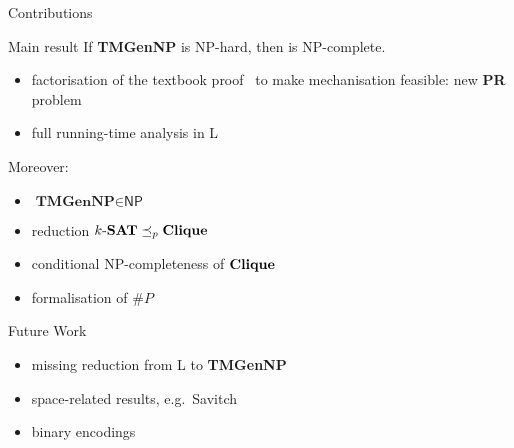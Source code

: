 \documentclass[11pt,usenames,dvipsnames,
hyperref={pdfencoding=auto,psdextra}]{beamer}
\makeatletter
\def\beamer@writeslidentry@miniframesoff{%
  \expandafter\beamer@ifempty\expandafter{\beamer@framestartpage}{}%
  {%
    \clearpage\beamer@notesactions%
  }
}
\newcommand*{\miniframesoff}{\let\beamer@writeslidentry=\beamer@writeslidentry@miniframesoff}
\newcommand*{\PR}{\textbf{PR}}
\newcommand*{\gennp}{\textbf{TMGenNP}}
\newcommand{\NP}{\textsf{NP}}
\newcommand{\redP}{\ensuremath{\preceq_p}}
\newcommand{\Clique}{\normalfont\textbf{Clique}}
\makeatother
\begin{document}
\begin{frame}{Contributions}
  \begin{block}{Main result}
    If \gennp{} is \NP{}-hard, then \SAT{} is \NP{}-complete. 
  \end{block}
  \begin{itemize}
    \item factorisation of the textbook proof~\cite{Sipser:TheoryofComputation} to make mechanisation feasible: new \PR{} problem
    \item full running-time analysis in L
  \end{itemize}

  Moreover: 
  \begin{itemize}
    \item $\gennp{} \in \NP{}$
    \item reduction $\text{$k$-\SAT{}} \redP{} \Clique{}$
    \item conditional \NP{}-completeness of $\Clique{}$
    \item formalisation of $\#P$
  \end{itemize}
\end{frame}

\begin{frame}{Future Work}
  \begin{itemize}
    \item missing reduction from L to \gennp{} 
    \item space-related results, e.g.\ Savitch
    \item binary encodings
  \end{itemize}
\end{frame}

\miniframesoff
\section{}
\end{document}
